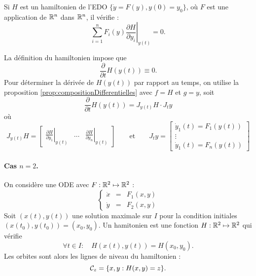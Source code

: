 \bigskip
\begin{proposition}[Hamiltionien] \label{prop:hamiltonien}
  Si $H$ est un hamiltonien de l'EDO $\{\dot y = F(y), y(0) = y_0\}$, où $F$ est une application de $\mathbb{R}^n$ dans $\mathbb{R}^n$, il vérifie :
  $$
  \sum_{i=1}^n F_i(y) \left.\frac{\partial H}{\partial y_i}\right|_{y(t)} = 0.
  $$
\end{proposition}

\proof
  La définition du hamiltonien impose que 
  $$
  \frac{\partial}{\partial t} H(y(t)) \equiv 0.
  $$
  Pour déterminer la dérivée de $H(y(t))$ par rapport au temps, on utilise la proposition \ref{prop:compositionDifferentielles} avec $f = H$ et $g = y$, soit
  $$
  \frac{\partial}{\partial t} H(y(t)) 
  = J_{y(t)}H \cdot J_ty
  $$
  où
  $$
  J_{y(t)}H = \left[ \begin{array}{ccc}
    \displaystyle{\left.\frac{\partial H}{\partial y_1}\right|_{y(t)}} & 
    \dots & 
    \displaystyle{\left.\frac{\partial H}{\partial y_n}\right|_{y(t)}} 
  \end{array}\right] 
  \qquad \text{et} \qquad 
  J_ty = \left[\begin{array}{c} 
    \dot y_1(t) = F_1(y(t)) \\
    \vdots \\
    \dot y_1(t) = F_n(y(t))
  \end{array}\right] 
  $$
\eproof

\paragraph*{Cas $n = 2$.} 
On considère une ODE avec $F : \mathbb{R}^2 \mapsto \mathbb{R}^2$ : 
$$
\left\{\begin{array}{rcl} \dot x & = & F_1(x, y) \\ \dot y & = & F_2(x, y) \end{array}\right.
$$
Soit $(x(t), y(t))$ une solution maximale sur $I$ pour la condition initiales $(x(t_0), y(t_0)) = (x_0, y_0)$. Un hamitonien est une fonction $H : \mathbb{R}^2 \mapsto \mathbb{R}^2$ qui vérifie
$$
\forall t \in I: \quad H(x(t), y(t)) = H(x_0, y_0).
$$
Les orbites sont alors les lignes de niveau du hamiltonien : 
$$
\mathcal{C}_z = \{x, y: H(x, y) = z\}.
$$

